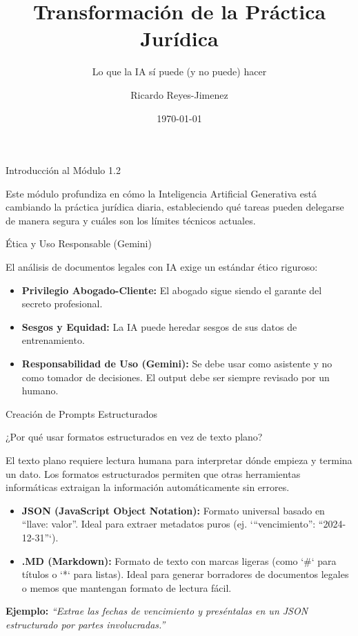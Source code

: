 \documentclass[aspectratio=169]{beamer}
\title[ Transformación de la Práctica]{ Transformación de la Práctica Jurídica}
\subtitle{ Lo que la IA sí puede (y no puede) hacer}
\author{Ricardo Reyes-Jimenez}
\institute{Universidad de La Sabana}
\date{\today}
\begin{document}
\begin{frame}
  \titlepage
\end{frame}

\usebackgroundtemplate{}



\begin{frame}[fragile]{Introducción al Módulo 1.2}


Este módulo profundiza en cómo la Inteligencia Artificial Generativa está cambiando la práctica jurídica diaria, estableciendo qué tareas pueden delegarse de manera segura y cuáles son los límites técnicos actuales.

\end{frame}



\begin{frame}[fragile]{Ética y Uso Responsable (Gemini)}


El análisis de documentos legales con IA exige un estándar ético riguroso:

\begin{itemize}
  \item \textbf{Privilegio Abogado-Cliente:} El abogado sigue siendo el garante del secreto profesional.
  \item \textbf{Sesgos y Equidad:} La IA puede heredar sesgos de sus datos de entrenamiento.
  \item \textbf{Responsabilidad de Uso (Gemini):} Se debe usar como asistente y no como tomador de decisiones. El output debe ser siempre revisado por un humano.
\end{itemize}
\end{frame}



\begin{frame}[fragile]{Creación de Prompts Estructurados}


¿Por qué usar formatos estructurados en vez de texto plano?

El texto plano requiere lectura humana para interpretar dónde empieza y termina un dato. Los formatos estructurados permiten que otras herramientas informáticas extraigan la información automáticamente sin errores.

\begin{itemize}
  \item \textbf{JSON (JavaScript Object Notation):} Formato universal basado en ``llave: valor''. Ideal para extraer metadatos puros (ej. `{``vencimiento'': ``2024-12-31''}`).
  \item \textbf{.MD (Markdown):} Formato de texto con marcas ligeras (como `\#` para títulos o `*` para listas). Ideal para generar borradores de documentos legales o memos que mantengan formato de lectura fácil.
\end{itemize}
\textbf{Ejemplo:} \textit{``Extrae las fechas de vencimiento y preséntalas en un JSON estructurado por partes involucradas.''}

\end{frame}
\end{document}
